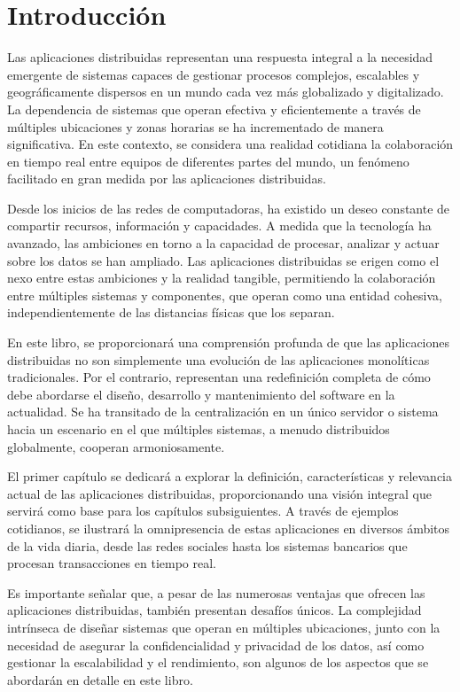 \chapter*{Introducción}
Las aplicaciones distribuidas representan una respuesta integral a la necesidad emergente de sistemas capaces de gestionar procesos complejos, escalables y geográficamente dispersos en un mundo cada vez más globalizado y digitalizado. La dependencia de sistemas que operan efectiva y eficientemente a través de múltiples ubicaciones y zonas horarias se ha incrementado de manera significativa. En este contexto, se considera una realidad cotidiana la colaboración en tiempo real entre equipos de diferentes partes del mundo, un fenómeno facilitado en gran medida por las aplicaciones distribuidas.

Desde los inicios de las redes de computadoras, ha existido un deseo constante de compartir recursos, información y capacidades. A medida que la tecnología ha avanzado, las ambiciones en torno a la capacidad de procesar, analizar y actuar sobre los datos se han ampliado. Las aplicaciones distribuidas se erigen como el nexo entre estas ambiciones y la realidad tangible, permitiendo la colaboración entre múltiples sistemas y componentes, que operan como una entidad cohesiva, independientemente de las distancias físicas que los separan.

En este libro, se proporcionará una comprensión profunda de que las aplicaciones distribuidas no son simplemente una evolución de las aplicaciones monolíticas tradicionales. Por el contrario, representan una redefinición completa de cómo debe abordarse el diseño, desarrollo y mantenimiento del software en la actualidad. Se ha transitado de la centralización en un único servidor o sistema hacia un escenario en el que múltiples sistemas, a menudo distribuidos globalmente, cooperan armoniosamente.

El primer capítulo se dedicará a explorar la definición, características y relevancia actual de las aplicaciones distribuidas, proporcionando una visión integral que servirá como base para los capítulos subsiguientes. A través de ejemplos cotidianos, se ilustrará la omnipresencia de estas aplicaciones en diversos ámbitos de la vida diaria, desde las redes sociales hasta los sistemas bancarios que procesan transacciones en tiempo real.

Es importante señalar que, a pesar de las numerosas ventajas que ofrecen las aplicaciones distribuidas, también presentan desafíos únicos. La complejidad intrínseca de diseñar sistemas que operan en múltiples ubicaciones, junto con la necesidad de asegurar la confidencialidad y privacidad de los datos, así como gestionar la escalabilidad y el rendimiento, son algunos de los aspectos que se abordarán en detalle en este libro.

